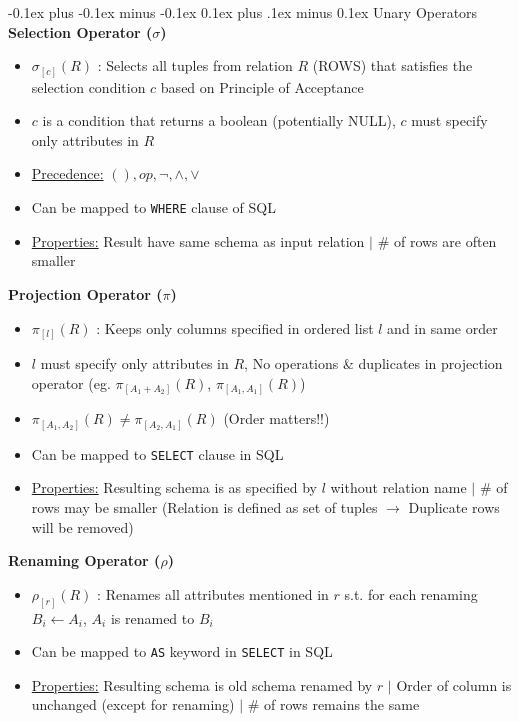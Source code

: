 \documentclass[landscape]{article}
\makeatletter
\renewcommand{\subsection}{\@startsection{subsection}{2}{0mm}%
  {-0.1ex plus -0.1ex minus -0.1ex}%
  {0.1ex plus .1ex minus 0.1ex}%
{\normalfont\scriptsize\bfseries}}
\makeatother
\begin{document}
\begin{multicols*}{5}
    \subsection{Unary Operators}
    \textbf{Selection Operator ($\sigma$)}
    \begin{itemize}
      \item $\sigma_{[c]}(R)$ : Selects all tuples from relation $R$ (ROWS) that satisfies the selection condition $c$ based on Principle of Acceptance
      \item $c$ is a condition that returns a boolean (potentially NULL), $c$ must specify only attributes in $R$
      \item \underline{Precedence:} $(), op, \neg , \wedge , \vee$
      \item Can be mapped to \verb|WHERE| clause of SQL
      \item \underline{Properties:} Result have same schema as input relation $\vert$ \# of rows are often smaller
    \end{itemize}
    \textbf{Projection Operator ($\pi$)}
    \begin{itemize}
      \item $\pi_{[l]}(R)$ : Keeps only columns specified in ordered list $l$ and in same order 
      \item $l$ must specify only attributes in $R$, No operations \& duplicates in projection operator (eg. $\pi_{[A_1 + A_2]}(R)$, $\pi_{[A_1, A_1]}(R)$)
      \item $\pi_{[A_1, A_2]}(R) \neq \pi_{[A_2, A_1]}(R)$ (Order matters!!)
      \item Can be mapped to \verb|SELECT| clause in SQL
      \item \underline{Properties:} Resulting schema is as specified by $l$ without relation name $\vert$ \# of rows may be smaller (Relation is defined as set of tuples $\rightarrow$ Duplicate rows will be removed)
    \end{itemize}
    \textbf{Renaming Operator ($\rho$)}
    \begin{itemize}
      \item $\rho_{[r]}(R)$ : Renames all attributes mentioned in $r$ s.t. for each renaming $B_i \leftarrow A_i$, $A_i$ is renamed to $B_i$
      \item Can be mapped to \verb|AS| keyword in \verb|SELECT| in SQL
      \item \underline{Properties:} Resulting schema is old schema renamed by $r$ $\vert$ Order of column is unchanged (except for renaming) $\vert$ \# of rows remains the same
    \end{itemize}


\end{multicols*}
\end{document}

